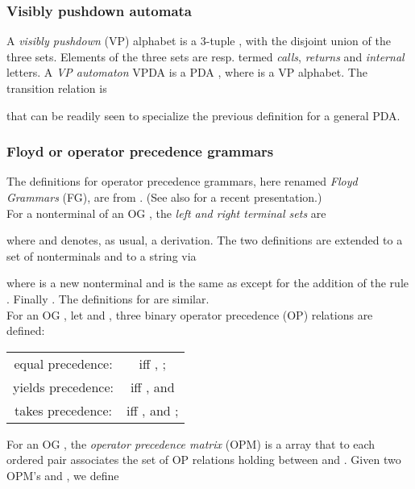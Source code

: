 \documentclass[3p,11pt]{elsarticle}
\begin{document}
\subsubsection*{Visibly pushdown automata}
A \emph{visibly pushdown} (VP) \cite{AluMad04} alphabet is a 3-tuple , with  the disjoint union of the three sets.  Elements of the three sets are resp. termed \emph{calls}, \emph{returns} and \emph{internal} letters.
\label{DetvisibPushdownAut} A  \emph{VP automaton} VPDA is a  PDA , where  is a VP alphabet. The transition relation is

that can be readily seen to specialize the previous definition for a general PDA.
\subsubsection*{Floyd or operator precedence grammars}
The  definitions for operator precedence grammars, here renamed \emph{Floyd Grammars} (FG), are from \cite{Crespi-ReghizziMM1978}. (See also \cite{GruneJacobs:08} for a recent presentation.) \label{LeftRightSets}
\\
For a nonterminal  of an OG , the \emph{left and right terminal sets} are

where  and  denotes, as usual, a derivation. The two definitions are extended to a set  of nonterminals and to a string  via

 where  is a new nonterminal and  is the same as  except for the addition of the
 rule .  Finally  . The definitions for  are similar.
\\
 \label{PrecRelat}
For an OG , let  and  , three binary operator precedence (OP) relations are defined:
\begin{center}
\begin{tabular}{cc}
  equal precedence:  &  iff , ; \\
  yields precedence:  &  iff ,  and  \\
  takes precedence: &  iff ,  and ; \\
\end{tabular}
\end{center}
\label{OPMatrixOPG} For an OG , the \emph{operator precedence matrix} (OPM)  is a  array that to each ordered pair  associates the set  of OP relations holding between  and .
Given two  OPM's   and , we define
\\
\end{document}
